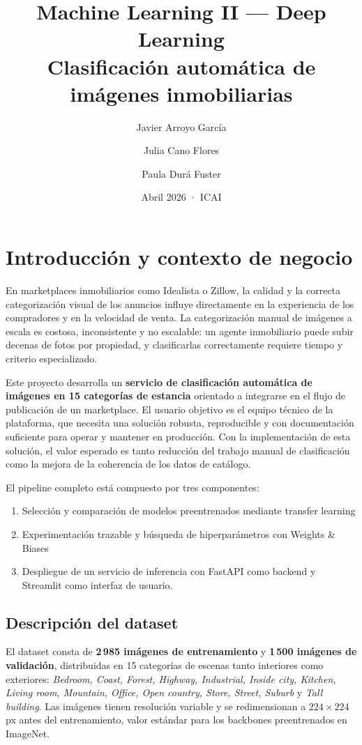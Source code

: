 \documentclass[11pt,a4paper]{article}
\title{\textbf{Machine Learning II — Deep Learning}\\[4pt]
\large Clasificación automática de imágenes inmobiliarias}
\author{Javier Arroyo García \and Julia Cano Flores \and Paula Durá Fuster}
\date{Abril 2026 · ICAI}
\begin{document}
\maketitle

\section{Introducción y contexto de negocio}

En marketplaces inmobiliarios como Idealista o Zillow, la calidad y la correcta categorización visual de los anuncios influye directamente en la experiencia de los compradores y en la velocidad de venta. La categorización manual de imágenes a escala es costosa, inconsistente y no escalable: un agente inmobiliario puede subir decenas de fotos por propiedad, y clasificarlas correctamente requiere tiempo y criterio especializado.

Este proyecto desarrolla un \textbf{servicio de clasificación automática de imágenes en 15 categorías de estancia} orientado a integrarse en el flujo de publicación de un marketplace. El usuario objetivo es el equipo técnico de la plataforma, que necesita una solución robusta, reproducible y con documentación suficiente para operar y mantener en producción. Con la implementación de esta solución, el valor esperado es tanto reducción del trabajo manual de clasificación como la mejora de la coherencia de los datos de catálogo.

El pipeline completo está compuesto por tres componentes: 
\begin{enumerate}
    \item Selección y comparación de modelos preentrenados mediante transfer learning
    \item Experimentación trazable y búsqueda de hiperparámetros con Weights \& Biases
    \item Despliegue de un servicio de inferencia con FastAPI como backend y Streamlit como interfaz de usuario.
\end{enumerate}

\subsection{Descripción del dataset}

El dataset consta de \textbf{2\,985 imágenes de entrenamiento} y \textbf{1\,500 imágenes de validación}, distribuidas en 15 categorías de escenas tanto interiores como exteriores: \textit{Bedroom, Coast, Forest, Highway, Industrial, Inside city, Kitchen, Living room, Mountain, Office, Open country, Store, Street, Suburb} y \textit{Tall building}. Las imágenes tienen resolución variable y se redimensionan a $224\times224$ px antes del entrenamiento, valor estándar para los backbones preentrenados en ImageNet.
\end{document}
